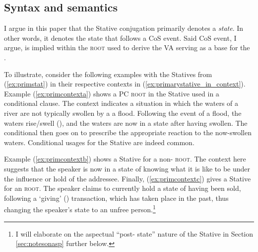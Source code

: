 \documentclass[output=paper,colorlinks,citecolor=brown]{langscibook}
\begin{document}
\subsection{Syntax and semantics}
\label{sec:primstatsem}

I argue in this paper that the Stative conjugation primarily denotes a  \textit{state}. In other words, it denotes the state that follows a CoS  event. Said CoS event, I argue, is implied within the \textsc{root} used to derive the VA serving as a base for the  \citep{kamil_phD}.

To illustrate, consider the following examples with the Statives from (\ref{ex:primstat}) in their respective contexts in (\ref{ex:primarystative_in_context}). Example (\ref{ex:primcontexta}) shows a PC \textsc{root} in the Stative used in a conditional clause. The context indicates a situation in which the waters of a river are not typically swollen by a a flood. Following the event of a flood, the waters rise/swell (), and the waters are now in a state after having swollen. The conditional then goes on to prescribe the appropriate reaction to the now-swollen waters. Conditional usages for the Stative are indeed common.

Example (\ref{ex:primcontextb}) shows a Stative for a non-  \textsc{root}.  The context here suggests that the speaker is now in a state of knowing what it is like to be under the influence or hold of the addressee. Finally, (\ref{ex:primcontextc})  gives a Stative for an   \textsc{root}.  The speaker claims to currently hold a state of having been sold, following a `giving' () transaction, which has taken place in the past, thus changing the speaker's state to an unfree person.\footnote{I will elaborate on the aspectual “post- state” nature of the Stative in Section \ref{sec:notesonasp} further below.}
\end{document}
